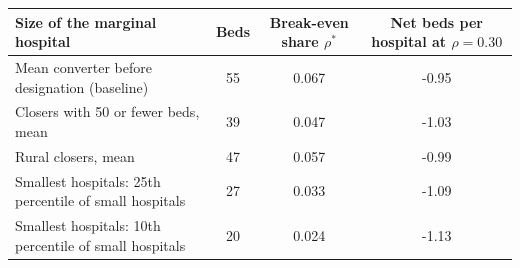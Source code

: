 \begin{tabular}{lccc}
\toprule
Size of the marginal hospital & Beds & Break-even share $\rho^*$ & Net beds per hospital at $\rho = 0.30$ \\
\midrule
Mean converter before designation (baseline) & 55 & 0.067 & -0.95 \\
Closers with 50 or fewer beds, mean & 39 & 0.047 & -1.03 \\
Rural closers, mean & 47 & 0.057 & -0.99 \\
Smallest hospitals: 25th percentile of small hospitals & 27 & 0.033 & -1.09 \\
Smallest hospitals: 10th percentile of small hospitals & 20 & 0.024 & -1.13 \\
\bottomrule
\end{tabular}
